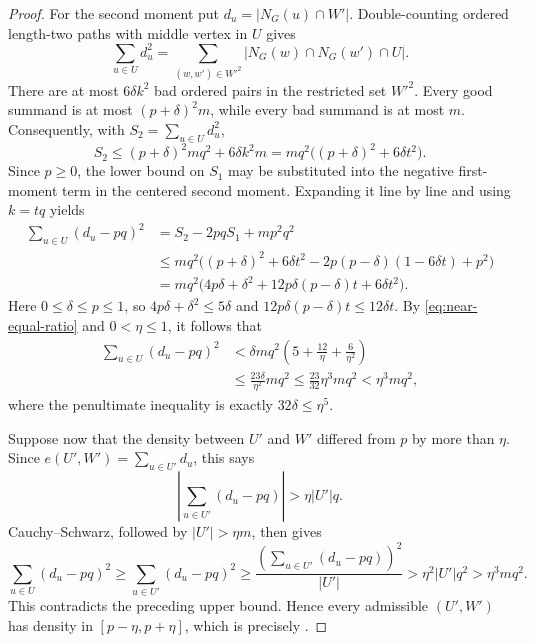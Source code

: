\begin{proof}
For the second moment put $d_u=|N_G(u)\cap W'|$.  Double-counting
ordered length-two paths with middle vertex in $U$ gives
\[
 \sum_{u\in U}d_u^2
 =\sum_{(w,w')\in W'^2}|N_G(w)\cap N_G(w')\cap U|.
\]
There are at most $6\delta k^2$ bad ordered pairs in the restricted set
$W'^2$.  Every good summand is at most $(p+\delta)^2m$, while every bad
summand is at most $m$.  Consequently, with
$S_2=\sum_{u\in U}d_u^2$,
\[
 S_2\leq (p+\delta)^2mq^2+6\delta k^2m
 =mq^2\bigl((p+\delta)^2+6\delta t^2\bigr).
\]
Since $p\geq0$, the lower bound on $S_1$ may be substituted into the
negative first-moment term in the centered second moment.  Expanding it
line by line and using $k=tq$ yields
\begin{align*}
 \sum_{u\in U}(d_u-pq)^2
 &=S_2-2pqS_1+mp^2q^2\\
 &\leq mq^2\bigl((p+\delta)^2+6\delta t^2
       -2p(p-\delta)(1-6\delta t)+p^2\bigr)\\
 &=mq^2\bigl(4p\delta+\delta^2
       +12p\delta(p-\delta)t+6\delta t^2\bigr).
\end{align*}
Here $0\leq\delta\leq p\leq1$, so
$4p\delta+\delta^2\leq5\delta$ and
$12p\delta(p-\delta)t\leq12\delta t$.  By
\eqref{eq:near-equal-ratio} and $0<\eta\leq1$, it follows that
\begin{align*}
 \sum_{u\in U}(d_u-pq)^2
 &<\delta mq^2\left(5+\frac{12}{\eta}
                         +\frac6{\eta^2}\right)\\
 &\leq \frac{23\delta}{\eta^2}mq^2
 \leq \frac{23}{32}\eta^3mq^2
 <\eta^3mq^2,
\end{align*}
where the penultimate inequality is exactly $32\delta\leq\eta^5$.

Suppose now that the density between $U'$ and $W'$ differed from $p$
by more than $\eta$.  Since
$e(U',W')=\sum_{u\in U'}d_u$, this says
\[
 \left|\sum_{u\in U'}(d_u-pq)\right|>\eta|U'|q.
\]
Cauchy--Schwarz, followed by $|U'|>\eta m$, then gives
\[
 \sum_{u\in U}(d_u-pq)^2
 \geq\sum_{u\in U'}(d_u-pq)^2
 \geq\frac{\left(\sum_{u\in U'}(d_u-pq)\right)^2}{|U'|}
 >\eta^2|U'|q^2
 >\eta^3mq^2.
\]
This contradicts the preceding upper bound.  Hence every admissible
$(U',W')$ has density in $[p-\eta,p+\eta]$, which is precisely
.
\end{proof}
